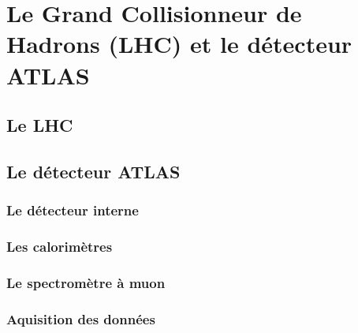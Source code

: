 \singlespacing{}
\section{Le Grand Collisionneur de Hadrons (LHC) et le détecteur
  ATLAS}
\label{sec:lhc_atlas}
\doublespacing{}

\subsection{Le LHC}
\label{sec:lhc_atlas:lhc}

\subsection{Le détecteur ATLAS}
\label{sec:lhc_atlas:atlas}

\subsubsection{Le détecteur interne}
\label{sec:lhc_atlas:atlas:indet}

\subsubsection{Les calorimètres}
\label{sec:lhc_atlas:atlas:calo}

\subsubsection{Le spectromètre à muon}
\label{sec:lhc_atlas:atlas:mu}

\subsubsection{Aquisition des données}
\label{sec:lhc_atlas:atlas:daq}
